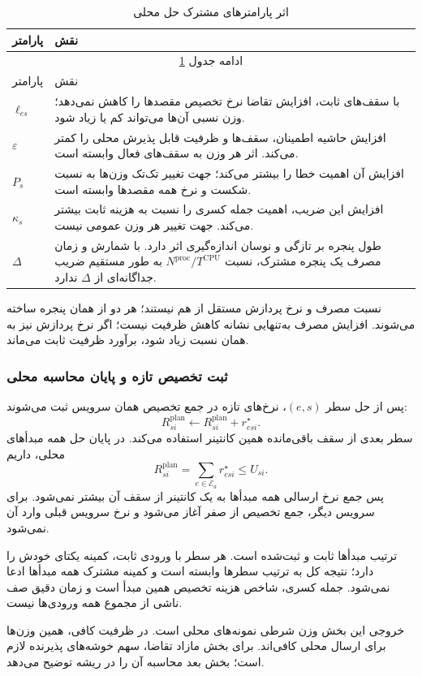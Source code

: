 \begin{longtable}{p{3.2cm}p{10.8cm}}
\caption{اثر پارامترهای مشترک حل محلی}\label{tab:shared-effects}\\
\toprule پارامتر & نقش \\
\midrule\endfirsthead
\multicolumn{2}{c}{ادامه جدول \ref{tab:shared-effects}}\\
\toprule پارامتر & نقش \\
\midrule\endhead\bottomrule\endfoot
$\ell_{es}$ & با سقف‌های ثابت، افزایش تقاضا نرخ تخصیص مقصدها را کاهش نمی‌دهد؛ وزن نسبی آن‌ها می‌تواند کم یا زیاد شود. \\
$\varepsilon$ & افزایش حاشیه اطمینان، سقف‌ها و ظرفیت قابل پذیرش محلی را کمتر می‌کند. اثر هر وزن به سقف‌های فعال وابسته است. \\
$P_s$ & افزایش آن اهمیت خطا را بیشتر می‌کند؛ جهت تغییر تک‌تک وزن‌ها به نسبت شکست و نرخ همه مقصدها وابسته است. \\
$\kappa_s$ & افزایش این ضریب، اهمیت جمله کسری را نسبت به هزینه ثابت بیشتر می‌کند. جهت تغییر هر وزن عمومی نیست. \\
$\Delta$ & طول پنجره بر تازگی و نوسان اندازه‌گیری اثر دارد. با شمارش و زمان مصرف یک پنجره مشترک، نسبت $N^{\mathrm{proc}}/T^{\mathrm{CPU}}$ به طور مستقیم ضریب جداگانه‌ای از $\Delta$ ندارد. \\
\end{longtable}
نسبت مصرف و نرخ پردازش مستقل از هم نیستند؛ هر دو از همان پنجره ساخته می‌شوند. افزایش مصرف به‌تنهایی نشانه کاهش ظرفیت نیست؛ اگر نرخ پردازش نیز به همان نسبت زیاد شود، برآورد ظرفیت ثابت می‌ماند.

\subsubsection{ثبت تخصیص تازه و پایان محاسبه محلی}

پس از حل سطر $(e,s)$، نرخ‌های تازه در جمع تخصیص همان سرویس ثبت می‌شوند:
\begin{equation}
 R^{\mathrm{plan}}_{si}\gets R^{\mathrm{plan}}_{si}+r_{esi}^{\star}.
 \label{eq:planned-update}
\end{equation}
سطر بعدی از سقف باقی‌مانده همین کانتینر استفاده می‌کند. در پایان حل همه مبدأهای محلی، داریم
\begin{equation}
 R^{\mathrm{plan}}_{si}=\sum_{e\in\mathcal E_a}r_{esi}^{\star}\leq U_{si}.
 \label{eq:aggregate-plan}
\end{equation}
پس جمع نرخ ارسالی همه مبدأها به یک کانتینر از سقف آن بیشتر نمی‌شود. برای سرویس دیگر، جمع تخصیص از صفر آغاز می‌شود و نرخ سرویس قبلی وارد آن نمی‌شود.

ترتیب مبدأها ثابت و ثبت‌شده است. هر سطر با ورودی ثابت، کمینه یکتای خودش را دارد؛ نتیجه کل به ترتیب سطرها وابسته است و کمینه مشترک همه مبدأها ادعا نمی‌شود. جمله کسری، شاخص هزینه تخصیص همین مبدأ است و زمان دقیق صف ناشی از مجموع همه ورودی‌ها نیست.

خروجی این بخش وزن شرطی نمونه‌های محلی است. در ظرفیت کافی، همین وزن‌ها برای ارسال محلی کافی‌اند. برای بخش مازاد تقاضا، سهم خوشه‌های پذیرنده لازم است؛ بخش بعد محاسبه آن را در ریشه توضیح می‌دهد.
